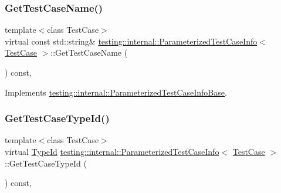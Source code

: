\mbox{\label{classtesting_1_1internal_1_1ParameterizedTestCaseInfo_a8a9eafc7654b154165f131974397e200}} 
\subsubsection{\texorpdfstring{GetTestCaseName()}{GetTestCaseName()}}
{\footnotesize\ttfamily template$<$class Test\+Case$>$ \\
virtual const std\+::string\& \mbox{\hyperlink{classtesting_1_1internal_1_1ParameterizedTestCaseInfo}{testing\+::internal\+::\+Parameterized\+Test\+Case\+Info}}$<$ \mbox{\hyperlink{classtesting_1_1TestCase}{Test\+Case}} $>$\+::Get\+Test\+Case\+Name (\begin{DoxyParamCaption}{ }\end{DoxyParamCaption}) const\hspace{0.3cm}{\ttfamily [inline]}, {\ttfamily [virtual]}}



Implements \mbox{\hyperlink{classtesting_1_1internal_1_1ParameterizedTestCaseInfoBase_ac69b3bc29debfd6d891b7f5b2d088b1c}{testing\+::internal\+::\+Parameterized\+Test\+Case\+Info\+Base}}.

\mbox{\label{classtesting_1_1internal_1_1ParameterizedTestCaseInfo_a16ed77e95a6042c722d0029744acfc33}} 
\subsubsection{\texorpdfstring{GetTestCaseTypeId()}{GetTestCaseTypeId()}}
{\footnotesize\ttfamily template$<$class Test\+Case$>$ \\
virtual \mbox{\hyperlink{namespacetesting_1_1internal_ab1114197d3c657d8b7f8e0c5caa12d00}{Type\+Id}} \mbox{\hyperlink{classtesting_1_1internal_1_1ParameterizedTestCaseInfo}{testing\+::internal\+::\+Parameterized\+Test\+Case\+Info}}$<$ \mbox{\hyperlink{classtesting_1_1TestCase}{Test\+Case}} $>$\+::Get\+Test\+Case\+Type\+Id (\begin{DoxyParamCaption}{ }\end{DoxyParamCaption}) const\hspace{0.3cm}{\ttfamily [inline]}, {\ttfamily [virtual]}}



